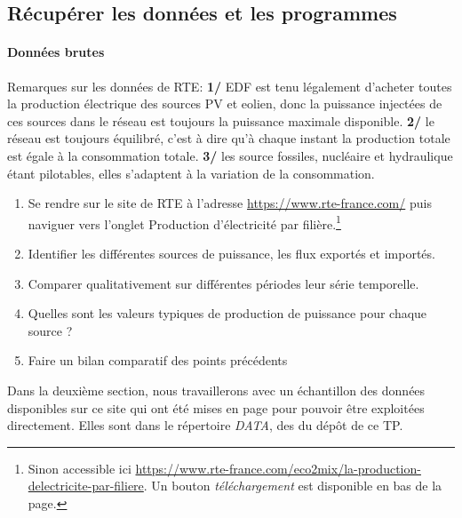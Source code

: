 \documentclass[12pt,french]{article}
\newcommand{\tmtextit}[1]{{\itshape{#1}}}
\begin{document}
\subsection{Récupérer les données et les programmes}

\paragraph{Données brutes}
Remarques sur les données de RTE: \textbf{1/} EDF est tenu légalement d'acheter toutes la production électrique des sources PV et eolien, donc la puissance injectées de ces sources dans le réseau est toujours la puissance maximale disponible. \textbf{2/} le réseau est toujours équilibré, c'est à dire qu'à chaque instant la production totale est égale à la consommation totale. \textbf{3/} les source fossiles, nucléaire et hydraulique étant pilotables, elles s'adaptent à la variation de la consommation.

\begin{enumerate}
    \item Se rendre sur le site de RTE à l'adresse 
    \href{https://www.rte-france.com/}{https://www.rte-france.com/} puis naviguer vers l'onglet Production d'électricité par filière.\footnote{Sinon accessible ici \href{https://www.rte-france.com/eco2mix/la-production-delectricite-par-filiere}{https://www.rte-france.com/eco2mix/la-production-delectricite-par-filiere}. Un bouton \textit{téléchargement} est disponible en bas de la page.}
    
    \item Identifier les différentes sources de puissance, les flux exportés et importés.
    
    \item  Comparer qualitativement sur différentes périodes leur série temporelle.
    
    \item Quelles sont les valeurs typiques de production de puissance pour chaque source ?
    
    \item Faire un bilan comparatif des points précédents
\end{enumerate}

Dans la deuxième section, nous travaillerons avec un échantillon des données disponibles sur ce site qui ont été mises en page pour pouvoir être exploitées directement.  Elles sont dans le répertoire \tmtextit{DATA}, des du dépôt de ce TP.
\end{document}
